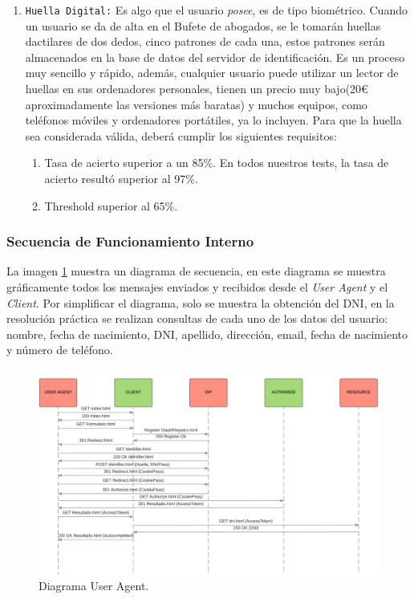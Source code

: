 \documentclass[a4,12pt,onecolum]{article}
\begin{document}
\begin{enumerate}
	\item \texttt{Huella Digital:} Es algo que el usuario \emph{posee}, es de tipo biométrico. Cuando un 			usuario se da de alta en el Bufete de abogados, se le tomarán huellas dactilares de dos dedos, cinco 			patrones de cada una, estos patrones serán almacenados en la base de datos del servidor de identificación. 		Es un proceso muy sencillo y rápido, además, cualquier usuario puede utilizar un lector de huellas en sus 		ordenadores personales, tienen un precio muy bajo(20\euro{} aproximadamente las versiones más baratas) y 		muchos equipos, como teléfonos móviles y ordenadores portátiles, ya lo incluyen.
	Para que la huella sea considerada válida, deberá cumplir los siguientes requisitos:
	\begin{enumerate}
		\item Tasa de acierto superior a un 85\%. En todos nuestros tests, la tasa de acierto resultó superior 			al 97\%.
		\item Threshold superior al 65\%.
	\end{enumerate}	 
	
\end{enumerate}


\subsubsection{Secuencia de Funcionamiento Interno}
La imagen \ref{fig:oauth2} muestra un diagrama de secuencia, en este diagrama se muestra gráficamente todos los mensajes enviados y recibidos desde el \emph{User Agent} y el \emph{Client}. Por simplificar el diagrama, solo se muestra la obtención del DNI, en la resolución práctica se realizan consultas de cada uno de los datos del usuario: nombre, fecha de nacimiento, DNI, apellido, dirección, email, fecha de nacimiento y número de teléfono.

\begin{figure}[htbp]
\centering
\includegraphics[width=1.1\textwidth]{./images/oauth/diagrama_flujo_useragent.png}
\caption{Diagrama User Agent.}
\label{fig:oauth2}
\end{figure}
\end{document}
